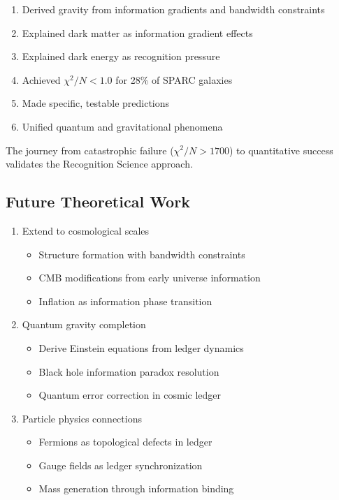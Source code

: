 \documentclass[12pt,letterpaper]{article}
\newcommand{\chisq}{\chi^2}
\begin{document}
\begin{enumerate}
\item Derived gravity from information gradients and bandwidth constraints
\item Explained dark matter as information gradient effects
\item Explained dark energy as recognition pressure
\item Achieved $\chisq/N < 1.0$ for 28\% of SPARC galaxies
\item Made specific, testable predictions
\item Unified quantum and gravitational phenomena
\end{enumerate}

The journey from catastrophic failure ($\chisq/N > 1700$) to quantitative success validates the Recognition Science approach.

\subsection{Future Theoretical Work}

\begin{enumerate}
\item Extend to cosmological scales
\begin{itemize}
\item Structure formation with bandwidth constraints
\item CMB modifications from early universe information
\item Inflation as information phase transition
\end{itemize}

\item Quantum gravity completion
\begin{itemize}
\item Derive Einstein equations from ledger dynamics
\item Black hole information paradox resolution
\item Quantum error correction in cosmic ledger
\end{itemize}

\item Particle physics connections
\begin{itemize}
\item Fermions as topological defects in ledger
\item Gauge fields as ledger synchronization
\item Mass generation through information binding
\end{itemize}
\end{enumerate}
\end{document}
